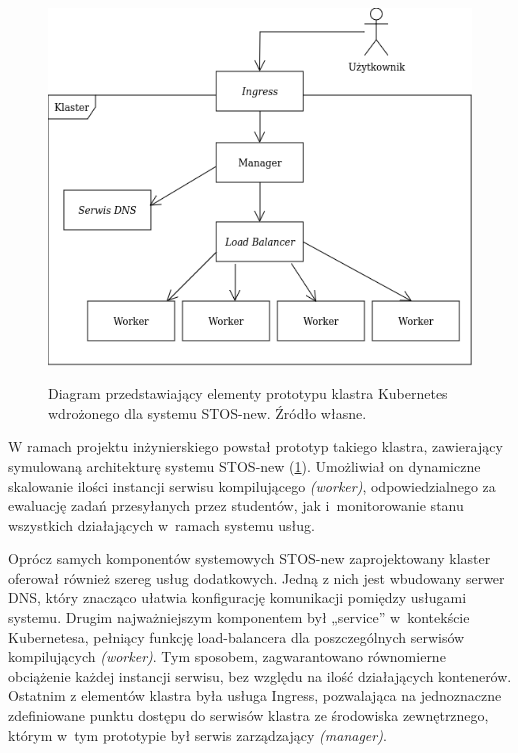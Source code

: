 \begin{figure}[!h]
	\begin{center}
		\resizebox{0.7\textwidth}{!} {
			\includegraphics{img/4/k8s.png}
		}
		\caption[Diagram prototypu klastra Kubernetes]{Diagram przedstawiający elementy prototypu klastra Kubernetes wdrożonego dla systemu STOS-new. Źródło własne.}
		\label{diagramk8s}
	\end{center}
\end{figure}

W ramach projektu inżynierskiego powstał prototyp takiego klastra, zawierający symulowaną architekturę systemu STOS-new (\ref{diagramk8s}). Umożliwiał on dynamiczne skalowanie ilości instancji serwisu kompilującego \textit{(worker)}, odpowiedzialnego za ewaluację zadań przesyłanych przez studentów, jak i~monitorowanie stanu wszystkich działających w~ramach systemu usług.

Oprócz samych komponentów systemowych STOS-new zaprojektowany klaster oferował również szereg usług dodatkowych. Jedną z nich jest wbudowany serwer DNS, który znacząco ułatwia konfigurację komunikacji pomiędzy usługami systemu\cite{k8sDns}. Drugim najważniejszym komponentem był „service” w~kontekście Kubernetesa, pełniący funkcję load-balancera dla poszczególnych serwisów kompilujących \textit{(worker)}. Tym sposobem, zagwarantowano równomierne obciążenie każdej instancji serwisu, bez względu na ilość działających kontenerów\cite{k8sService}. Ostatnim z elementów klastra była usługa Ingress, pozwalająca na jednoznaczne zdefiniowane punktu dostępu do serwisów klastra ze środowiska zewnętrznego, którym w~tym prototypie był serwis zarządzający \textit{(manager)}\cite{k8sIngress}.

